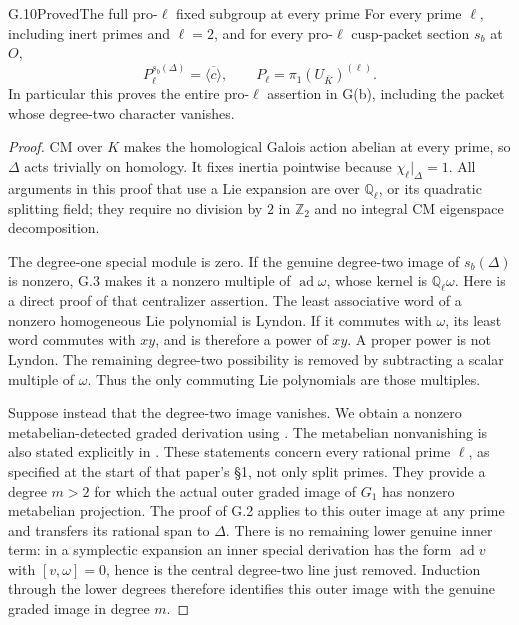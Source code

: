 \begin{statement}{G.10}{Proved}{The full pro-$\ell$ fixed subgroup at every prime}
For every prime $\ell$, including inert primes and $\ell=2$, and
for every pro-$\ell$ cusp-packet section $s_b$ at $O$,
\[
 P_\ell^{s_b(\Delta)}=\overline{\langle c\rangle},
 \qquad P_\ell=\pi_1(U_{\overline K})^{(\ell)}.            \tag{G.12}
\]
In particular this proves the entire pro-$\ell$ assertion in G(b),
including the packet whose degree-two character vanishes.
\end{statement}
\begin{proof}
CM over $K$ makes the homological Galois action abelian at every
prime, so $\Delta$ acts trivially on homology. It fixes inertia
pointwise because $\chi_\ell|_\Delta=1$. All arguments in this
proof that use a Lie expansion are over $\mathbb Q_\ell$, or its
quadratic splitting field; they require no division by $2$ in
$\mathbb Z_2$ and no integral CM eigenspace decomposition.

The degree-one special module is zero. If the genuine degree-two
image of $s_b(\Delta)$ is nonzero, G.3 makes it a nonzero multiple
of $\operatorname{ad}\omega$, whose kernel is $\mathbb Q_\ell\omega$.
Here is a direct proof of that centralizer assertion. The least
associative word of a nonzero homogeneous Lie polynomial is Lyndon.
If it commutes with $\omega$, its least word commutes with $xy$,
and is therefore a power of $xy$. A proper power is not Lyndon.
The remaining degree-two possibility is removed by subtracting a
scalar multiple of $\omega$. Thus the only commuting Lie
polynomials are those multiples.

Suppose instead that the degree-two image vanishes. We obtain a
nonzero metabelian-detected graded derivation using
\citet[Lemma 3.12, Claim 4.14.1, equation 4.14.2, and the proof of
Corollary 4.15]{Nakamura1995}. The metabelian nonvanishing is also stated explicitly in
\citet[Theorem 5.9 and the following paragraph]{Tsunogai1995}.
These statements concern every
rational prime $\ell$, as specified at the start of that paper's
\S1, not only split primes. They provide a degree $m>2$ for which
the actual outer graded image of $G_1$ has nonzero metabelian
projection. The proof of G.2 applies to this outer image at any
prime and transfers its rational span to $\Delta$. There is no
remaining lower genuine inner term: in a symplectic expansion
an inner special derivation has the form $\operatorname{ad}v$
with $[v,\omega]=0$, hence is the central degree-two line just
removed. Induction through the lower degrees therefore identifies
this outer image with the genuine graded image in degree $m$.


\end{proof}
